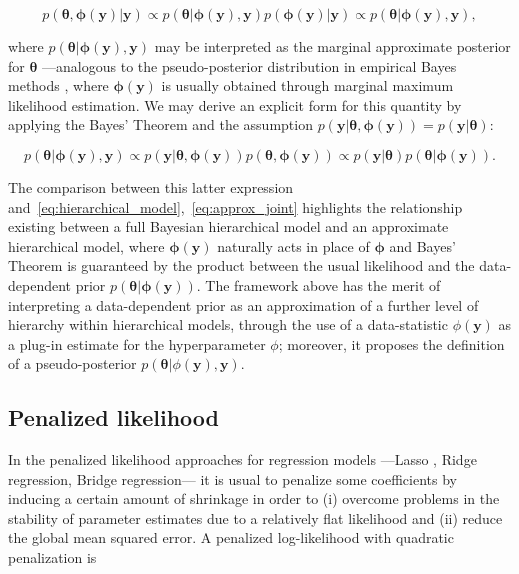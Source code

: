 \documentclass{statsoc}
\begin{document}
\begin{equation}
 p(\bm{\theta}, \bm{\phi}(\bm{y})|\bm{y}) \propto p(\bm{\theta}| \bm{\phi}(\bm{y}), \bm{y}) p( \bm{\phi}(\bm{y})| \bm{y}) \propto p(\bm{\theta}| \bm{\phi}(\bm{y}), \bm{y}),  
 \label{eq:approx_joint}
 \end{equation}

where $p(\bm{\theta}| \bm{\phi}(\bm{y}), \bm{y})$ may be interpreted as the marginal approximate posterior for $\bm{\theta}$ ---analogous to the pseudo-posterior distribution in empirical Bayes methods \citep{petrone2014empirical}, where $\bm{\phi}(\bm{y})$ is usually obtained through marginal maximum likelihood estimation. We may derive an explicit form for this quantity by applying the Bayes' Theorem and the assumption $p(\bm{y}| \bm{\theta}, \bm{\phi}(\bm{y}))=p(\bm{y}| \bm{\theta})$:

\begin{equation}
p(\bm{\theta}| \bm{\phi}(\bm{y}), \bm{y}) \propto p(\bm{y}| \bm{\theta}, \bm{\phi}(\bm{y}))p(\bm{\theta}, \bm{\phi}(\bm{y}) ) \propto p(\bm{y}| \bm{\theta})p(\bm{\theta}|\bm{\phi}(\bm{y})).
\label{eq:appr_hierarchical_model}
\end{equation}

The comparison between this latter expression and~\eqref{eq:hierarchical_model},~\eqref{eq:approx_joint} highlights the relationship existing between a full Bayesian  hierarchical model and an approximate hierarchical model, where $\bm{\phi}(\bm{y})$ naturally acts in place of $\bm{\phi}$ and Bayes' Theorem is guaranteed by the product between the usual likelihood and the data-dependent prior $p(\bm{\theta}|\bm{\phi}(\bm{y}))$. The framework above has the merit of interpreting a data-dependent prior as an approximation of a further level of hierarchy within hierarchical models, through the use of a data-statistic $\phi(\bm{y})$ as a plug-in estimate for the hyperparameter $\phi$; moreover, it proposes the definition of a pseudo-posterior $p(\bm{\theta}| \phi(\bm{y}), \bm{y})$. 

\subsection{Penalized likelihood}
\label{sec:penalized}

In the penalized likelihood approaches for regression models ---Lasso \citep{tibshirani1996regression}, Ridge regression, Bridge regression--- it is usual to penalize some coefficients by inducing a certain amount of shrinkage in order to (i) overcome problems in the
stability of parameter estimates due to a relatively flat  likelihood and (ii) reduce the global mean squared error. A penalized log-likelihood with quadratic penalization is 
\end{document}
